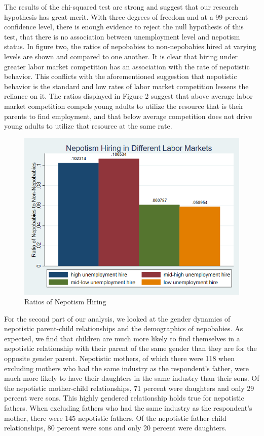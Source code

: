 \documentclass[12pt]{article}
\begin{document}
The results of the chi-squared test are strong and suggest that our research hypothesis has great merit. With three degrees of freedom and at a 99 percent confidence level, there is enough evidence to reject the null hypothesis of this test, that there is no association between unemployment level and nepotism status. In figure two, the ratios of nepobabies to non-nepobabies hired at varying levels are shown and compared to one another. It is clear that hiring under greater labor market competition has an association with the rate of nepotistic behavior. This conflicts with the aforementioned suggestion that nepotistic behavior is the standard and low rates of labor market competition lessens the reliance on it. The ratios displayed in Figure 2 suggest that above average labor market competition compels young adults to utilize the resource that is their parents to find employment, and that below average competition does not drive young adults to utilize that resource at the same rate.


\begin{figure}
    \centering
    \includegraphics[width=0.65\linewidth]{nepotismratios.png}
    \caption{Ratios of Nepotism Hiring}
    \label{fig:enter-label}
\end{figure}

For the second part of our analysis, we looked at the gender dynamics of nepotistic parent-child relationships and the demographics of nepobabies. As expected, we find that children are much more likely to find themselves in a nepotistic relationship with their parent of the same gender than they are for the opposite gender parent. Nepotistic mothers, of which there were 118 when excluding mothers who had the same industry as the respondent’s father, were much more likely to have their daughters in the same industry than their sons. Of the nepotistic mother-child relationships, 71 percent were daughters and only 29 percent were sons. This highly gendered relationship holds true for nepotistic fathers. When excluding fathers who had the same industry as the respondent’s mother, there were 145 nepotistic fathers. Of the nepotistic father-child relationships, 80 percent were sons and only 20 percent were daughters. 
\end{document}
